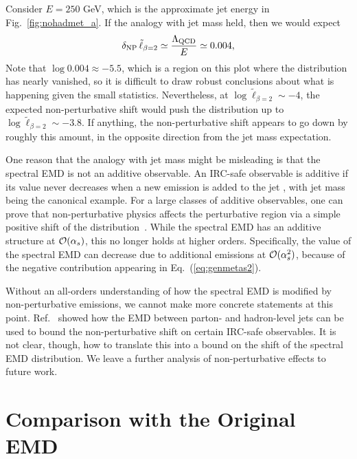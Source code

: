 \documentclass[letterpaper,11pt]{article}
\DeclareRobustCommand{\Fig}[1]{Fig.~\ref{#1}}
\DeclareRobustCommand{\Eq}[1]{Eq.~(\ref{#1})}
\DeclareRobustCommand{\InRef}[1]{Ref.~\cite{#1}}
\begin{document}
Consider $E = 250$ GeV, which is the approximate jet energy in \Fig{fig:nohadmet_a}.
%
If the analogy with jet mass held, then we would expect
%
\begin{align}
\delta_{\rm NP} \, \tilde \ell_{\beta = 2} \simeq \frac{\Lambda_\text{QCD}}{E}\simeq 0.004,
\end{align}
%
%
Note that $\log 0.004 \approx -5.5$, which is a region on this plot where the distribution has nearly vanished, so it is difficult to draw robust conclusions about what is happening given the small statistics.
%
Nevertheless, at $\log \tilde \ell_{\beta = 2} \sim -4$, the expected non-perturbative shift would push the distribution up to $\log \tilde \ell_{\beta = 2} \sim -3.8$.
%
If anything, the non-perturbative shift appears to go down by roughly this amount, in the opposite direction from the jet mass expectation.


One reason that the analogy with jet mass might be misleading is that the spectral EMD is not an additive observable.
%
An IRC-safe observable is additive if its value never decreases when a new emission is added to the jet \cite{Banfi:2004yd}, with jet mass being the canonical example.
%
For a large classes of additive observables, one can prove that non-perturbative physics affects the perturbative region via a simple positive shift of the distribution~\cite{Lee:2006fn}.
%
While the spectral EMD has an additive structure at ${\cal O}(\alpha_s)$, this no longer holds at higher orders.
%
Specifically, the value of the spectral EMD can decrease due to additional emissions at ${\cal O}(\alpha_s^2)$, because of the negative contribution appearing in \Eq{eq:genmetas2}.


Without an all-orders understanding of how the spectral EMD is modified by non-perturbative emissions, we cannot make more concrete statements at this point.
%
\InRef{Komiske:2019fks} showed how the EMD between parton- and hadron-level jets can be used to bound the non-perturbative shift on certain IRC-safe observables.
%
It is not clear, though, how to translate this into a bound on the shift of the spectral EMD distribution.
%
We leave a further analysis of non-perturbative effects to future work.



\section{Comparison with the Original EMD}
\label{sec:emdvsspec}
\end{document}
